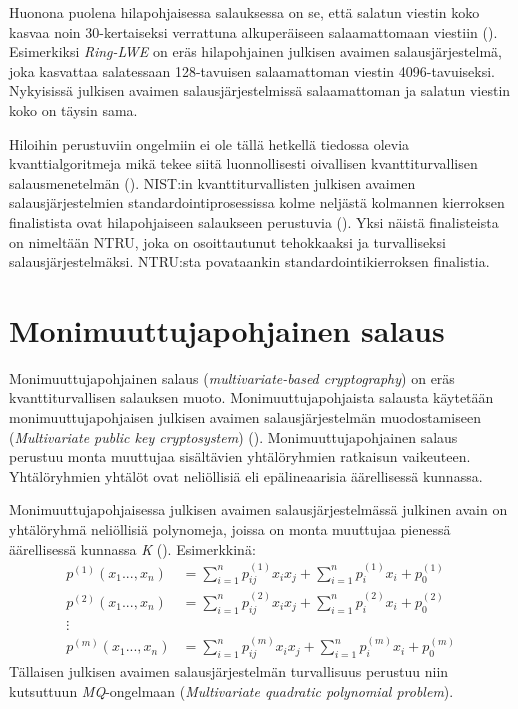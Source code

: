 Huonona puolena hilapohjaisessa salauksessa on se, että salatun viestin koko kasvaa noin 30-kertaiseksi verrattuna alkuperäiseen salaamattomaan viestiin (\cite{8275352}). Esimerkiksi \emph{Ring-LWE} on eräs hilapohjainen julkisen avaimen salausjärjestelmä, joka kasvattaa salatessaan 128-tavuisen salaamattoman viestin 4096-tavuiseksi. Nykyisissä julkisen avaimen salausjärjestelmissä salaamattoman ja salatun viestin koko on täysin sama.

Hiloihin perustuviin ongelmiin ei ole tällä hetkellä tiedossa olevia kvanttialgoritmeja mikä tekee siitä luonnollisesti oivallisen kvanttiturvallisen salausmenetelmän (\cite{regev2006lattice}). NIST:in kvanttiturvallisten julkisen avaimen salausjärjestelmien standardointiprosessissa kolme neljästä kolmannen kierroksen finalistista ovat hilapohjaiseen salaukseen perustuvia (\cite{alagic2020status}). Yksi näistä finalisteista on nimeltään NTRU, joka on osoittautunut tehokkaaksi ja turvalliseksi salausjärjestelmäksi. NTRU:sta povataankin standardointikierroksen finalistia.

\section{Monimuuttujapohjainen salaus}
Monimuuttujapohjainen salaus (\emph{multivariate-based cryptography}) on eräs kvanttiturvallisen salauksen muoto. Monimuuttujapohjaista salausta käytetään monimuuttujapohjaisen julkisen avaimen salausjärjestelmän muodostamiseen (\emph{Multivariate public key cryptosystem}) (\cite{Ding2009}). Monimuuttujapohjainen salaus perustuu monta muuttujaa sisältävien yhtälöryhmien ratkaisun vaikeuteen. Yhtälöryhmien yhtälöt ovat neliöllisiä eli epälineaarisia äärellisessä kunnassa.

Monimuuttujapohjaisessa julkisen avaimen salausjärjestelmässä julkinen avain on yhtälöryhmä neliöllisiä polynomeja, joissa on monta muuttujaa pienessä äärellisessä kunnassa \emph{K} (\cite{8012305}). Esimerkkinä: 
    \begin{align*}
        p^{(1)}(x_{1}...,x_{n}) &= \sum_{i=1}^{n} p_{ij}^{(1)}x_{i}x_ {j}+\sum_{i=1}^{n}p_ {i}^{(1)}x_{i}+p_ {0}^{(1)} \\
        p^{(2)}(x_{1}...,x_{n}) &= \sum_{i=1}^{n} p_{ij}^{(2)}x_{i}x_ {j}+\sum_{i=1}^{n}p_ {i}^{(2)}x_{i}+p_ {0}^{(2)} \\
        \vdots \\
        p^{(m)}(x_{1}...,x_{n}) &= \sum_{i=1}^{n} p_{ij}^{(m)}x_{i}x_ {j}+\sum_{i=1}^{n}p_ {i}^{(m)}x_{i}+p_ {0}^{(m)}
    \end{align*}
Tällaisen julkisen avaimen salausjärjestelmän turvallisuus perustuu niin kutsuttuun \emph{MQ}-ongelmaan (\emph{Multivariate quadratic polynomial problem}).

